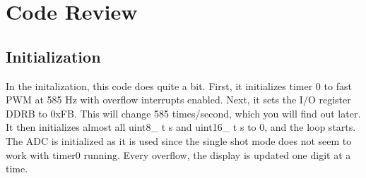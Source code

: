 \documentclass{hitec}
\begin{document}


\section{Code Review}
\subsection{Initialization}
In the initalization, this code does quite a bit. First, it initializes timer 0 to fast PWM at 585 Hz with overflow interrupts enabled. Next, it sets the I/O register DDRB to 0xFB. This will change 585 times/second, which you will find out later. It then initializes almost all uint8\_ t s and uint16\_ t s to 0, and the loop starts. The ADC is initialized as it is used since the single shot mode does not seem to work with timer0 running. Every overflow, the display is updated one digit at a time. 
\end{document}

